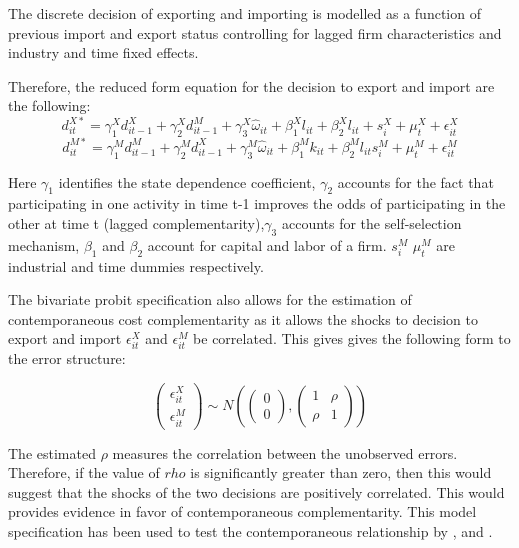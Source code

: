 \documentclass[12pt]{article}
\begin{document}
The discrete decision of exporting and importing is modelled as a function of previous import and
export status controlling for lagged firm characteristics and industry and time fixed
effects. 

Therefore, the reduced form equation for the decision to export and
import are the following: 
\begin{equation}
d_{it}^{X*} = \gamma_{1}^{X} d_{it-1}^{X} + \gamma_{2}^{X} d_{it-1}^{M}+
\gamma_{3}^{X} \hat{\omega}_{it}  + \beta_{1}^{X}l_{it}  +\beta_{2}^{X}l_{it}+
s_{i}^{X} + \mu_{t}^{X}  + \epsilon_{it}^{X}
\end{equation}
\begin{equation}
d_{it}^{M*} = \gamma_{1}^{M} d_{it-1}^{M} + \gamma_{2}^{M} d_{it-1}^{X}+
\gamma_{3}^{M} \hat{\omega}_{it}  + \beta_{1}^{M}k_{it}  +\beta_{2}^{M}l_{it}
s_{i}^{M} + \mu_{t}^{M}  + \epsilon_{it}^{M}
\end{equation}

Here $\gamma_{1}$ identifies the state dependence coefficient, $\gamma_{2}$ accounts for
the fact that participating in one activity in time t-1 improves the
odds of participating in the other at time t (lagged complementarity),$\gamma_{3}$ accounts for
the self-selection mechanism, $\beta_{1}$ and $\beta_{2}$ account for
capital and labor of a firm.  $s_{i}^{M}$  $\mu_{t}^{M}$ are industrial
and time dummies respectively.

The bivariate probit specification also allows for the estimation of 
contemporaneous cost complementarity as it allows the shocks to
decision to export and import 
$\epsilon_{it}^{X}$ and $\epsilon_{it}^{M}$  be
correlated. This gives gives the following form to the error
structure: 


\[\begin{pmatrix}
\epsilon_{it}^{X} \\
\epsilon_{it}^{M}
\end{pmatrix}\sim N\left(\begin{pmatrix}
0 \\
0
\end{pmatrix},\begin{pmatrix}
1 & \rho \\
\rho & 1
\end{pmatrix}\right)
\]


The estimated $\rho$ measures the correlation between the unobserved
errors. Therefore, if the value of $rho$ is significantly greater than
zero,  then this would suggest that the shocks of the two decisions
are positively correlated. This would provides evidence in favor 
of contemporaneous complementarity.  
This model specification has been used to test the contemporaneous relationship
by \textcite{aristei2013firms}, \textcite{aw2007export} and \textcite{manez2015dynamic}. 
\end{document}
